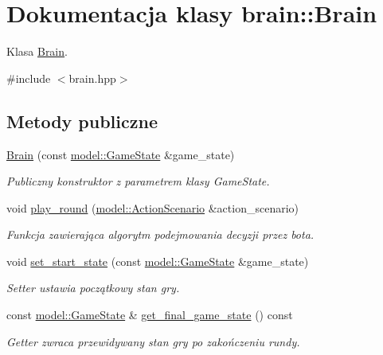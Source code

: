 \hypertarget{classbrain_1_1Brain}{}\section{Dokumentacja klasy brain\+:\+:Brain}
\label{classbrain_1_1Brain}


Klasa \hyperlink{classbrain_1_1Brain}{Brain}.  




{\ttfamily \#include $<$brain.\+hpp$>$}

\subsection*{Metody publiczne}
\begin{DoxyCompactItemize}
\item 
\hyperlink{classbrain_1_1Brain_a5efd1dd47e7690151af7d6cd68ebc05f}{Brain} (const \hyperlink{structmodel_1_1GameState}{model\+::\+Game\+State} \&game\+\_\+state)
\begin{DoxyCompactList}\small\item\em Publiczny konstruktor z parametrem klasy Game\+State. \end{DoxyCompactList}\item 
\mbox{\label{classbrain_1_1Brain_a653e083f826df79c344738c4e8bf96dd}} 
void \hyperlink{classbrain_1_1Brain_a653e083f826df79c344738c4e8bf96dd}{play\+\_\+round} (\hyperlink{action_8hpp_a052d176abf53b10863680ac55e7ba40d}{model\+::\+Action\+Scenario} \&action\+\_\+scenario)
\begin{DoxyCompactList}\small\item\em Funkcja zawierająca algorytm podejmowania decyzji przez bota. \end{DoxyCompactList}\item 
\mbox{\label{classbrain_1_1Brain_a57f51c02e64db80611cfafed74084a9d}} 
void \hyperlink{classbrain_1_1Brain_a57f51c02e64db80611cfafed74084a9d}{set\+\_\+start\+\_\+state} (const \hyperlink{structmodel_1_1GameState}{model\+::\+Game\+State} \&game\+\_\+state)
\begin{DoxyCompactList}\small\item\em Setter ustawia początkowy stan gry. \end{DoxyCompactList}\item 
\mbox{\label{classbrain_1_1Brain_afd6c8a12a98468660eb54d2f564e7a8b}} 
const \hyperlink{structmodel_1_1GameState}{model\+::\+Game\+State} \& \hyperlink{classbrain_1_1Brain_afd6c8a12a98468660eb54d2f564e7a8b}{get\+\_\+final\+\_\+game\+\_\+state} () const
\begin{DoxyCompactList}\small\item\em Getter zwraca przewidywany stan gry po zakończeniu rundy. \end{DoxyCompactList}\end{DoxyCompactItemize}


